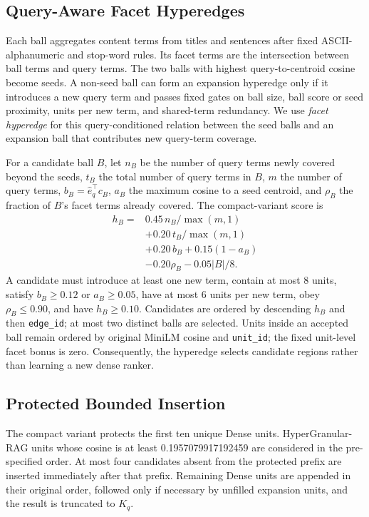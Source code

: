 \documentclass[11pt]{article}
\newcommand{\hgrag}{HyperGranular-RAG\xspace}
\begin{document}
\subsection{Query-Aware Facet Hyperedges}

Each ball aggregates content terms from titles and sentences after fixed
ASCII-alphanumeric and stop-word rules. Its facet terms are the intersection
between ball terms and query terms. The two balls with highest query-to-centroid
cosine become seeds. A non-seed ball can form an expansion hyperedge only if it
introduces a new query term and passes fixed gates on ball size, ball score or
seed proximity, units per new term, and shared-term redundancy.
We use \emph{facet hyperedge} for this query-conditioned relation between the
seed balls and an expansion ball that contributes new query-term coverage.

For a candidate ball $B$, let $n_B$ be the number of query terms newly covered
beyond the seeds, $t_B$ the total number of query terms in $B$, $m$ the number
of query terms, $b_B=\hat e_q^\top c_B$, $a_B$ the maximum cosine to a seed
centroid, and $\rho_B$ the fraction of $B$'s facet terms already covered. The
compact-variant score is
\begin{equation}
\begin{split}
h_B={}&0.45\,n_B/\max(m,1)\\
     &+0.20\,t_B/\max(m,1)\\
     &+0.20\,b_B+0.15(1-a_B)\\
     &-0.20\rho_B-0.05|B|/8.
\end{split}
\end{equation}
A candidate must introduce at least one new term, contain at most 8 units,
satisfy $b_B\geq0.12$ or $a_B\geq0.05$, have at most 6 units per new term,
obey $\rho_B\leq0.90$, and have $h_B\geq0.10$. Candidates are ordered by
descending $h_B$ and then \texttt{edge\_id}; at most two distinct balls are
selected. Units inside an accepted ball remain ordered by original MiniLM
cosine and \texttt{unit\_id}; the fixed unit-level facet bonus is zero.
Consequently, the hyperedge selects candidate regions rather than learning a
new dense ranker.

\subsection{Protected Bounded Insertion}

The compact variant protects the first ten unique Dense units. \hgrag units
whose cosine is at least 0.1957079917192459 are considered in the pre-specified
order. At most four candidates absent from the protected prefix are
inserted immediately after that prefix. Remaining Dense units are appended in
their original order, followed only if necessary by unfilled expansion units,
and the result is truncated to $K_q$.
\end{document}
